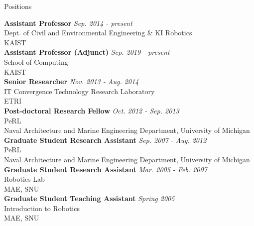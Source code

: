 \begin{rSection}{Positions}

{\bf Assistant Professor} \hfill {\em Sep. 2014 - present} \\
Dept. of Civil and Environmental Engineering \& KI Robotics\\
\acf{KAIST}\\

{\bf Assistant Professor (Adjunct)} \hfill {\em Sep. 2019 - present} \\
School of Computing\\
\acf{KAIST}\\

{\bf Senior Researcher} \hfill {\em Nov. 2013 - Aug. 2014} \\
IT Convergence Technology Research Laboratory\\
\acf{ETRI}\\

{\bf Post-doctoral Research Fellow} \hfill {\em Oct. 2012 - Sep. 2013} \\
\acf{PeRL}\\
Naval Architecture and Marine Engineering Department, University of Michigan\\

{\bf Graduate Student Research Assistant} \hfill {\em Sep. 2007 - Aug. 2012} \\
\acf{PeRL}\\
Naval Architecture and Marine Engineering Department, University of Michigan\\

{\bf Graduate Student Research Assistant} \hfill {\em Mar. 2005 - Feb. 2007} \\
Robotics Lab\\
\acf{MAE}, \acf{SNU}\\

{\bf Graduate Student Teaching Assistant} \hfill {\em Spring 2005} \\
Introduction to Robotics\\
\acf{MAE}, \acf{SNU}\\

\end{rSection}
